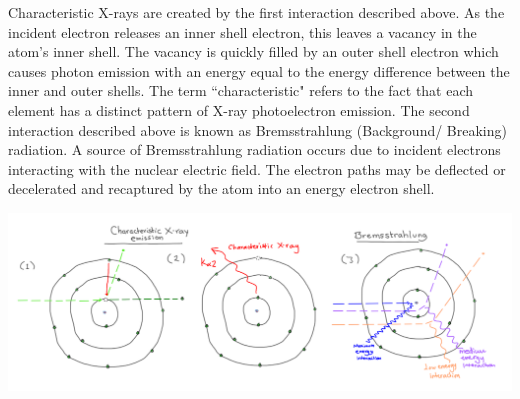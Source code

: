 \documentclass[10pt, a4paper, singlespacing]{report}
\newenvironment{Figure}
    {\par\medskip\noindent\minipage{\linewidth}}
    {\endminipage\par\medskip}
\begin{document}
Characteristic X-rays are created by the first interaction described above. As the incident electron releases an inner shell electron, this leaves a vacancy in the atom's inner shell. The vacancy is quickly filled by an outer shell electron which causes photon emission with an energy equal to the energy difference between the inner and outer shells. The term ``characteristic" refers to the fact that each element has a distinct pattern of X-ray photoelectron emission.
The second interaction described above is known as Bremsstrahlung (Background/ Breaking) radiation. A source of Bremsstrahlung radiation occurs due to incident electrons interacting with the nuclear electric field. The electron paths may be deflected or decelerated and recaptured by the atom into an energy electron shell. 
\begin{Figure}
\centering
\includegraphics[width=\linewidth]{characteristic_Bremsstrahlung.pdf}\label{fig:3}
\end{Figure}
\end{document}
